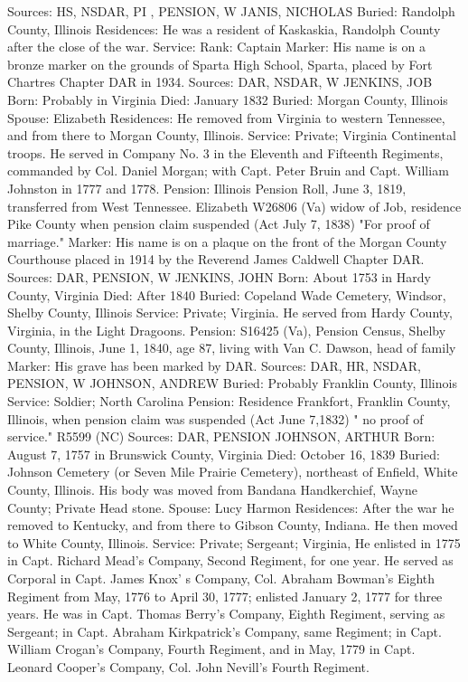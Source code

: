 Sources: HS, NSDAR, PI , PENSION, W 
JANIS, NICHOLAS 
Buried: Randolph County, Illinois 
Residences: He was a resident of Kaskaskia, Randolph County after the close of the war. 
Service: Rank: Captain
Marker: His name is on a bronze marker on the grounds of Sparta High School, Sparta, placed by Fort Chartres Chapter DAR in 1934. 
Sources: DAR, NSDAR, W 
JENKINS, JOB 
Born: Probably in Virginia 
Died: January 1832 
Buried: Morgan County, Illinois 
Spouse: Elizabeth 
Residences: He removed from Virginia to western Tennessee, and from there to Morgan County, Illinois.
Service: Private; Virginia Continental troops. He served in Company No. 3 in the Eleventh and Fifteenth Regiments, commanded by Col. Daniel Morgan; with Capt. Peter Bruin and Capt. William Johnston in 1777 and 1778.
Pension: Illinois Pension Roll, June 3, 1819, transferred from West Tennessee. Elizabeth W26806 (Va) widow of Job, residence Pike County when pension claim suspended (Act July 7, 1838) "For proof of marriage." 
Marker: His name is on a plaque on the front of the Morgan County Courthouse placed in 1914 by the Reverend James Caldwell Chapter DAR. 
Sources: DAR, PENSION, W 
JENKINS, JOHN 
Born: About 1753 in Hardy County, Virginia 
Died: After 1840 
Buried: Copeland Wade Cemetery, Windsor, Shelby County, Illinois 
Service: Private; Virginia. He served from Hardy County, Virginia, in the Light Dragoons. 
Pension: S16425 (Va), Pension Census, Shelby County, Illinois, June 1, 1840, age 87, living with Van C. Dawson, head of family 
Marker: His grave has been marked by DAR. 
Sources: DAR, HR, NSDAR, PENSION, W 
JOHNSON, ANDREW 
Buried: Probably Franklin County, Illinois 
Service: Soldier; North Carolina
Pension: Residence Frankfort, Franklin County, Illinois, when pension claim was suspended (Act June 7,1832) " no proof of service." R5599 (NC) 
Sources: DAR, PENSION 
JOHNSON, ARTHUR 
Born: August 7, 1757 in Brunswick County, Virginia
Died: October 16, 1839 
Buried: Johnson Cemetery (or Seven Mile Prairie Cemetery), northeast of Enfield, White County, Illinois. His body was moved from Bandana Handkerchief, Wayne County; Private Head stone. 
Spouse: Lucy Harmon 
Residences: After the war he removed to Kentucky, and from there to Gibson County, Indiana. He then moved to White County, Illinois. 
Service: Private; Sergeant; Virginia, He enlisted in 1775 in Capt. Richard Mead's Company, Second Regiment, for one year. He served as Corporal in Capt. James Knox' s Company, Col. Abraham Bowman's Eighth Regiment from May, 1776 to April 30, 1777; enlisted January 2, 1777 for three years. He was in Capt. Thomas Berry's Company, Eighth Regiment, serving as Sergeant; in Capt. Abraham Kirkpatrick's Company, same Regiment; in Capt. William Crogan's Company, Fourth Regiment, and in May, 1779 in Capt. Leonard Cooper's Company, Col. John Nevill's Fourth Regiment. 
